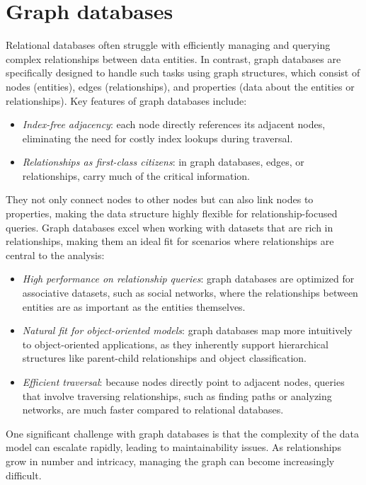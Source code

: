 \section{Graph databases}

Relational databases often struggle with efficiently managing and querying complex relationships between data entities. 
In contrast, graph databases are specifically designed to handle such tasks using graph structures, which consist of nodes (entities), edges (relationships), and properties (data about the entities or relationships).
Key features of graph databases include:
\begin{itemize}
    \item \textit{Index-free adjacency}: each node directly references its adjacent nodes, eliminating the need for costly index lookups during traversal.
    \item \textit{Relationships as first-class citizens}: in graph databases, edges, or relationships, carry much of the critical information. 
\end{itemize}
They not only connect nodes to other nodes but can also link nodes to properties, making the data structure highly flexible for relationship-focused queries.
Graph databases excel when working with datasets that are rich in relationships, making them an ideal fit for scenarios where relationships are central to the analysis:
\begin{itemize}
    \item \textit{High performance on relationship queries}: graph databases are optimized for associative datasets, such as social networks, where the relationships between entities are as important as the entities themselves.
    \item \textit{Natural fit for object-oriented models}: graph databases map more intuitively to object-oriented applications, as they inherently support hierarchical structures like parent-child relationships and object classification.
    \item \textit{Efficient traversal}: because nodes directly point to adjacent nodes, queries that involve traversing relationships, such as finding paths or analyzing networks, are much faster compared to relational databases.
\end{itemize}
One significant challenge with graph databases is that the complexity of the data model can escalate rapidly, leading to maintainability issues. 
As relationships grow in number and intricacy, managing the graph can become increasingly difficult.

